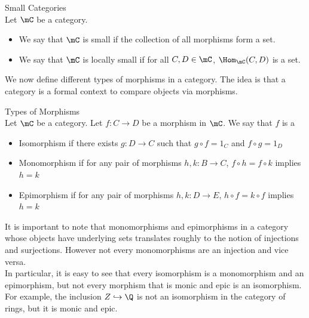 \documentclass[a4paper]{article}
\begin{document}
\begin{defn}{Small Categories}{}\\
Let $\mC$ be a category. 
\begin{itemize}
\item We say that $\mC$ is small if the collection of all morphisms form a set. 
\item We say that $\mC$ is locally small if for all $C,D\in\mC$, $\Hom_\mC(C,D)$ is a set. 
\end{itemize}
\end{defn}

We now define different types of morphisms in a category. The idea is that a category is a formal context to compare objects via morphisms. 

\begin{defn}{Types of Morphisms}{}\\
Let $\mC$ be a category. Let $f:C\to D$ be a morphism in $\mC$. We say that $f$ is a 
\begin{itemize}
\item Isomorphism if there exists $g:D\to C$ such that $g\circ f=1_C$ and $f\circ g=1_D$
\item Monomorphism if for any pair of morphisms $h,k:B\to C$, $f\circ h=f\circ k$ implies $h=k$
\item Epimorphism if for any pair of morphisms $h,k:D\to E$, $h\circ f=k\circ f$ implies $h=k$
\end{itemize}
\end{defn}

It is important to note that monomorphisms and epimorphisms in a category whose objects have underlying sets translates roughly to the notion of injections and surjections. However not every monomorphisms are an injection and vice versa. \\

In particular, it is easy to see that every isomorphism is a monomorphism and an epimorphism, but not every morphism that is monic and epic is an isomorphism. For example, the inclusion $Z\hookrightarrow\Q$ is not an isomorphism in the category of rings, but it is monic and epic. 
\end{document}
